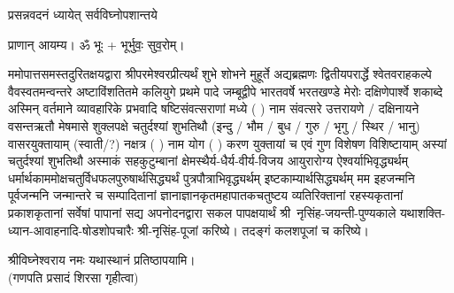 
\setlength{\parindent}{0pt}




{प्रसन्नवदनं ध्यायेत् सर्वविघ्नोपशान्तये}
 
प्राणान्  आयम्य।  ॐ भूः + भूर्भुवः॒ सुव॒रोम्।


ममोपात्तसमस्तदुरितक्षयद्वारा श्रीपरमेश्वरप्रीत्यर्थं शुभे शोभने मुहूर्ते अद्यब्रह्मणः
द्वितीयपरार्द्धे श्वेतवराहकल्पे वैवस्वतमन्वन्तरे अष्टाविंशतितमे कलियुगे प्रथमे पादे
जम्बूद्वीपे भारतवर्षे भरतखण्डे मेरोः दक्षिणेपार्श्वे शकाब्दे अस्मिन् वर्तमाने व्यावहारिके
 प्रभवादि षष्टिसंवत्सराणां मध्ये (	) नाम संवत्सरे उत्तरायणे / दक्षिनायने 
वसन्तऋतौ  मेषमासे शुक्लपक्षे चतुर्दश्यां शुभतिथौ
(इन्दु / भौम / बुध / गुरु / भृगु / स्थिर / भानु) वासरयुक्तायाम्
(स्वाती/?) नक्षत्र (  ) नाम  योग  (  ) करण युक्तायां च एवं गुण विशेषण विशिष्टायाम्
अस्यां	चतुर्दश्यां शुभतिथौ 
अस्माकं सहकुटुम्बानां क्षेमस्थैर्य-धैर्य-वीर्य-विजय आयुरारोग्य ऐश्वर्याभिवृद्ध्यर्थम्
 धर्मार्थकाममोक्ष\-चतुर्विधफलपुरुषार्थसिद्ध्यर्थं पुत्रपौत्राभि\-वृद्ध्यर्थम् इष्टकाम्यार्थसिद्ध्यर्थम्
मम इहजन्मनि पूर्वजन्मनि जन्मान्तरे च सम्पादितानां ज्ञानाज्ञानकृतमहा\-पातकचतुष्टय
व्यतिरिक्तानां रहस्यकृतानां प्रकाशकृतानां सर्वेषां पापानां सद्य अपनोदनद्वारा सकल 
पापक्षयार्थं श्री~नृसिंह-जयन्ती-पुण्यकाले   यथाशक्ति-ध्यान-आवाहनादि-षोडशो\-पचारैः श्री-नृसिंह-पूजां करिष्ये। तदङ्गं कलशपूजां च करिष्ये।


श्रीविघ्नेश्वराय नमः यथास्थानं प्रतिष्ठापयामि।\\
(गणपति प्रसादं शिरसा गृहीत्वा)
\renewcommand{\devaName}{विष्णु}













